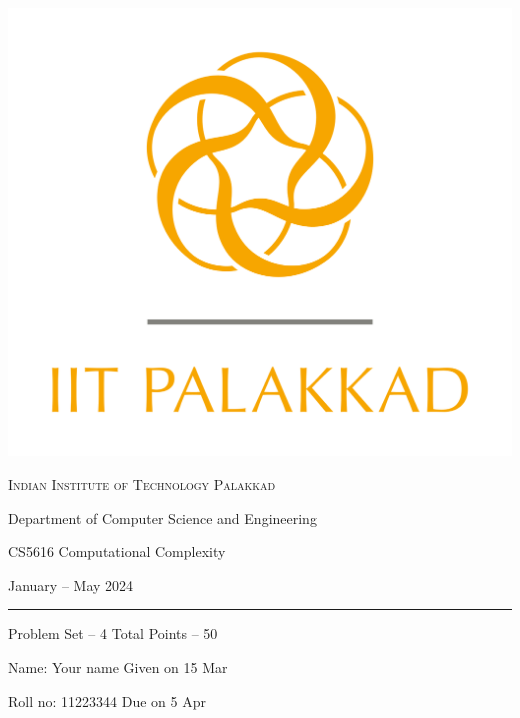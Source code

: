 \documentclass[12pt, a4paper,answers]{exam}
\begin{document}
	\noindent
	\begin{minipage}[l]{0.1\textwidth}
		\noindent
		\includegraphics[width=2.4\textwidth]{iitpkd}
	\end{minipage}
	\hfill
	\begin{minipage}[c]{0.8\textwidth}
		\begin{center}
			{\large \textsc{\textcolor{iitpkdcolor}{Indian Institute of Technology Palakkad}} \par
				\small	Department of Computer Science and Engineering	\par
				\large	CS5616 Computational Complexity \par 
				\small January -- May 2024}
		\end{center}
	\end{minipage}
	\par
\vspace{2mm}
\hrule
\vspace{2mm}
\begin{minipage}{0.9\textwidth} 
	\textsf{Problem Set} -- 4  \hfill  \textsf{Total Points} -- 50
	
	{\small \textsf{Name}: Your name    \hfill \small \textsf{Given on} 15 Mar}
	
	{\small \textsf{Roll no}: 11223344  \hfill \small \textsf{Due on} 5 Apr}
\end{minipage}
	\vspace{0.2in}
\noindent
\end{document}

